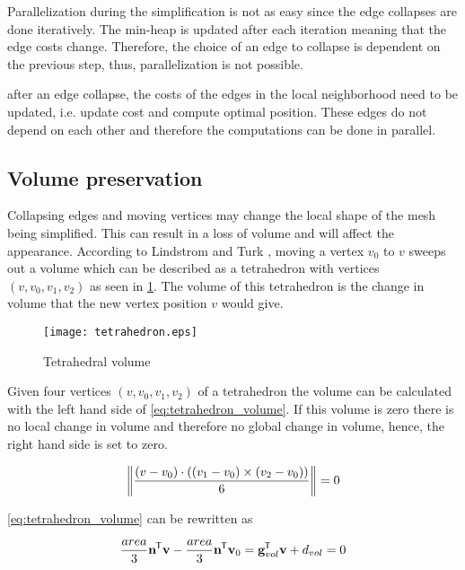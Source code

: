Parallelization during the simplification is not as easy since the edge collapses are done iteratively. The min-heap is updated after each iteration meaning that the edge costs change. Therefore, the choice of an edge to collapse is dependent on the previous step, thus, parallelization is not possible.

after an edge collapse, the costs of the edges in the local neighborhood need to be updated, i.e. update cost and compute optimal position. These edges do not depend on each other and therefore the computations can be done in parallel.

\subsection{Volume preservation} \label{sec:volume_preservation}
Collapsing edges and moving vertices may change the local shape of the mesh being simplified. This can result in a loss of volume and will affect the appearance. According to Lindstrom and Turk \cite{lindstrom1998fast} , moving a vertex $v_0$ to $v$ sweeps out a volume which can be described as a tetrahedron with vertices $(v, v_0, v_1, v_2)$ as seen in \cref{fig:tetrahedron}. The volume of this tetrahedron is the change in volume that the new vertex position $v$ would give. 

\begin{figure}[h]
    \centering
    \texttt{[image: tetrahedron.eps]}
    \caption{Tetrahedral volume}
    \label{fig:tetrahedron}
\end{figure}

Given four vertices $(v, v_0, v_1, v_2)$ of a tetrahedron the volume can be calculated with the left hand side of \cref{eq:tetrahedron_volume}. If this volume is zero there is no local change in volume and therefore no global change in volume, hence, the right hand side is set to zero.

\begin{equation} \label{eq:tetrahedron_volume}
\norm*{\frac{(v - v_0) \cdot ((v_1-v_0) \times (v_2 - v_0))}{6}} = 0
\end{equation}

\cref{eq:tetrahedron_volume} can be rewritten as 

\begin{equation} \label{eq:tetrahedron_volume_rewritten}
\frac{area}{3} \mathbf{n}\transpose \mathbf{v} - \frac{area}{3} \mathbf{n}\transpose \mathbf{v}_0 = \mathbf{g}_{vol}\transpose \mathbf{v} + d_{vol} = 0
\end{equation}


